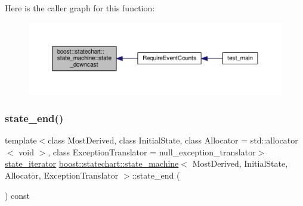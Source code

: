Here is the caller graph for this function\+:
\nopagebreak
\begin{figure}[H]
\begin{center}
\leavevmode
\includegraphics[width=350pt]{classboost_1_1statechart_1_1state__machine_a8054170cced8b908272d9d8ba9e5deb9_icgraph}
\end{center}
\end{figure}
\mbox{\label{classboost_1_1statechart_1_1state__machine_aab9cfe96af77fbfb10098f9c6ba209a5}} 
\subsubsection{\texorpdfstring{state\+\_\+end()}{state\_end()}}
{\footnotesize\ttfamily template$<$class Most\+Derived, class Initial\+State, class Allocator = std\+::allocator$<$ void $>$, class Exception\+Translator = null\+\_\+exception\+\_\+translator$>$ \\
\mbox{\hyperlink{classboost_1_1statechart_1_1state__machine_1_1state__iterator}{state\+\_\+iterator}} \mbox{\hyperlink{classboost_1_1statechart_1_1state__machine}{boost\+::statechart\+::state\+\_\+machine}}$<$ Most\+Derived, Initial\+State, Allocator, Exception\+Translator $>$\+::state\+\_\+end (\begin{DoxyParamCaption}{ }\end{DoxyParamCaption}) const\hspace{0.3cm}{\ttfamily [inline]}}

